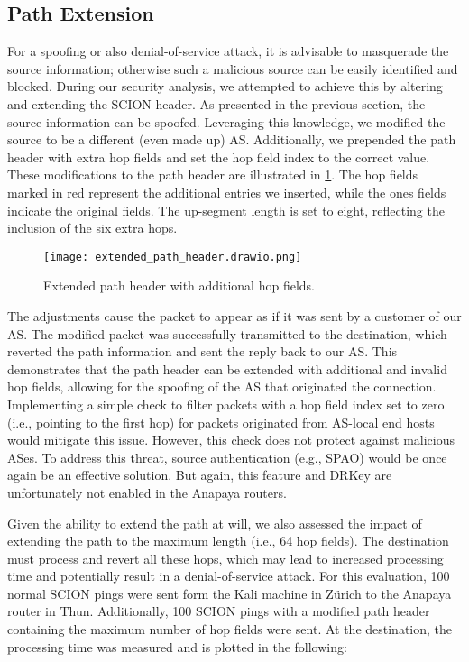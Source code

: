 \subsection{Path Extension}
\label{sec:path-extension}
For a spoofing or also denial-of-service attack, it is advisable to masquerade the source information; otherwise such a malicious source can be easily identified and blocked.
During our security analysis, we attempted to achieve this by altering and extending the SCION header.
As presented in the previous section, the source information can be spoofed.
Leveraging this knowledge, we modified the source to be a different (even made up) AS.
Additionally, we prepended the path header with extra hop fields and set the hop field index to the correct value.
These modifications to the path header are illustrated in \cref{extended_path_header}.
The hop fields marked in red represent the additional entries we inserted, while the ones fields indicate the original fields.
The up-segment length is set to eight, reflecting the inclusion of the six extra hops.

\begin{figure}[h]
    \centering
    \texttt{[image: extended\_path\_header.drawio.png]}
    \caption{Extended path header with additional hop fields.}
    \label{extended_path_header}
\end{figure}

The adjustments cause the packet to appear as if it was sent by a customer of our AS.
The modified packet was successfully transmitted to the destination, which reverted the path information and sent the reply back to our AS.
This demonstrates that the path header can be extended with additional and invalid hop fields, allowing for the spoofing of the AS that originated the connection.
Implementing a simple check to filter packets with a hop field index set to zero (i.e., pointing to the first hop) for packets originated from AS-local end hosts would mitigate this issue.
However, this check does not protect against malicious ASes.
To address this threat, source authentication (e.g., SPAO) would be once again be an effective solution.
But again, this feature and DRKey are unfortunately not enabled in the Anapaya routers.

Given the ability to extend the path at will, we also assessed the impact of extending the path to the maximum length (i.e., 64 hop fields).
The destination must process and revert all these hops, which may lead to increased processing time and potentially result in a denial-of-service attack.
For this evaluation, 100 normal SCION pings were sent form the Kali machine in Zürich to the Anapaya router in Thun.
Additionally, 100 SCION pings with a modified path header containing the maximum number of hop fields were sent.
At the destination, the processing time was measured and is plotted in the following:

